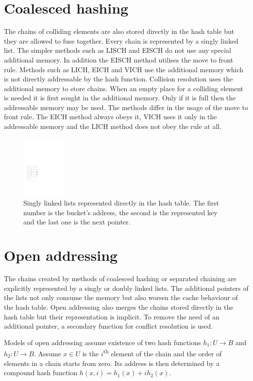 \section{Coalesced hashing}
The chains of colliding elements are also stored directly in the hash table but they are allowed to fuse together. Every chain is represented by a singly linked list. The simpler methods such as LISCH and EISCH do not use any special additional memory. In addition the EISCH method utilises the move to front rule. Methods such as LICH, EICH and VICH use the additional memory which is not directly addressable by the hash function. Collision resolution uses the additional memory to store chains. When an empty place for a colliding element is needed it is first sought in the additional memory. Only if it is full then the addressable memory may be used. The methods differ in the usage of the move to front rule. The EICH method always obeys it, VICH uses it only in the addressable memory and the LICH method does not obey the rule at all.

\begin{figure}
  \centering
    \includegraphics[width=0.2\textwidth]{images/vich}
  \caption{Singly linked lists represented directly in the hash table. The first number is the bucket's address, the second is the represented key and the last one is the next pointer.}
\end{figure}

\section{Open addressing}
The chains created by methods of coalesced hashing or separated chaining are explicitly represented by a singly or doubly linked lists. The additional pointers of the lists not only consume the memory but also worsen the cache behaviour of the hash table. Open addressing also merges the chains stored directly in the hash table but their representation is implicit. To remove the need of an additional pointer, a secondary function for conflict resolution is used.

Models of open addressing assume existence of two hash functions $h_1: U \rightarrow B$ and $h_2: U \rightarrow B$. Assume $x \in U$ is the $i$\textsuperscript{th} element of the chain and the order of elements in a chain starts from zero. Its address is then determined by a compound hash function $h(x, i) = h_1(x) + i h_2(x)$.

